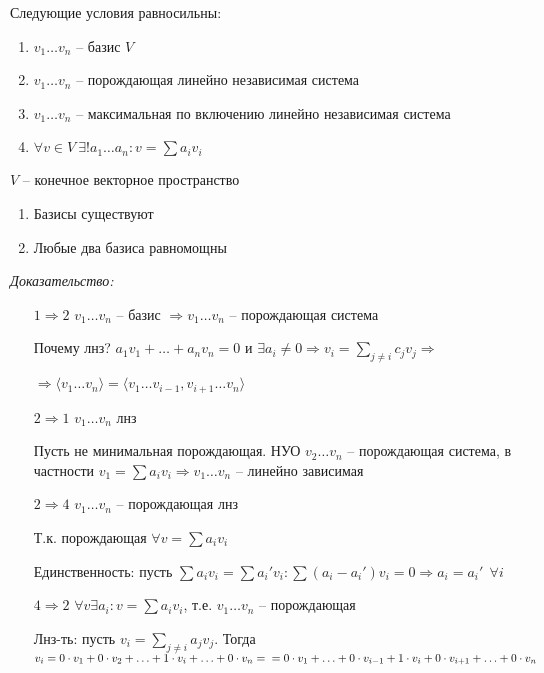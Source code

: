 \documentclass[12pt]{article}
\newcommand{\q}[1]{\langle #1 \rangle}
\begin{document}
\begin{theo}{}
    Следующие условия равносильны:

    \begin{enumerate}
        \item $v_1 \ldots v_n$ -- базис $V$
        \item $v_1 \ldots v_n$ -- порождающая линейно независимая система
        \item $v_1 \ldots v_n$ -- максимальная по включению линейно независимая система
        \item $\forall v \in V\ \exists! a_1 \ldots a_n : v = \sum a_iv_i$
    \end{enumerate}
\end{theo}



\begin{theo}{}
    $V$ -- конечное векторное пространство

    \begin{enumerate}
        \item Базисы существуют
        \item Любые два базиса равномощны
    \end{enumerate}
\end{theo}

\textit{Доказательство:}

\begin{enumerate}
    \item[$1 \Rightarrow 2$] $v_1 \ldots v_n$ -- базис $\Rightarrow v_1 \ldots v_n$ -- порождающая система
    
    Почему лнз? $a_1v_1 + \ldots + a_nv_n = 0$ и $\exists a_i \neq 0 \Rightarrow v_i = \sum\limits_{j \neq i} c_jv_j \Rightarrow$

    $\Rightarrow \q{v_1 \ldots v_n} = \q{v_1 \ldots v_{i - 1}, v_{i + 1} \ldots v_n}$

    \item[$2 \Rightarrow 1$] $v_1 \ldots v_n$ лнз
    
    Пусть не минимальная порождающая. НУО $v_2 \ldots v_n$ -- порождающая система, в частности $v_1 = \sum a_iv_i \Rightarrow v_1 \ldots v_n$ -- линейно зависимая 

    \item[$2 \Rightarrow 4$] $v_1 \ldots v_n$ -- порождающая лнз
    
    Т.к. порождающая $\forall v = \sum a_iv_i$

    Единственность: пусть $\sum a_iv_i = \sum a_i'v_i : \sum (a_i - a_i')v_i = 0 \Rightarrow a_i = a_i'\ \ \forall i$

    \item[$4 \Rightarrow 2$] $\forall v \exists a_i : v = \sum a_iv_i$, т.е. $v_1 \ldots v_n$ -- порождающая
    
    Лнз-ть: пусть $v_i = \sum\limits_{j \neq i} a_jv_j$. Тогда $v_i = 0 \cdot v_1 + 0 \cdot v_2 + \ldots + 1 \cdot v_i + \ldots + 0 \cdot v_n = \\ = 0 \cdot v_1 + \ldots + 0 \cdot v_{i - 1} + 1 \cdot v_i + 0 \cdot v_{i + 1} + \ldots + 0 \cdot v_n$
\end{enumerate}
\end{document}

